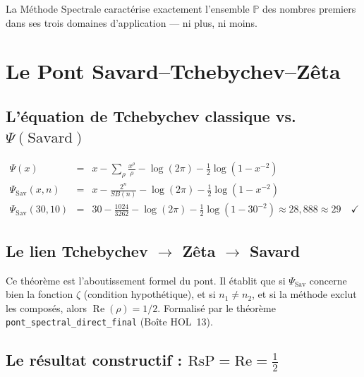 \documentclass[]{pasj02}
\begin{document}
\begin{theorem}
  La Méthode Spectrale caractérise exactement l'ensemble $\mathbb{P}$ des
  nombres premiers dans ses trois domaines d'application --- ni plus, ni
  moins.
\end{theorem}

\section{Le Pont Savard--Tchebychev--Zêta}
\label{sec:pont}

\subsection{L'équation de Tchebychev classique vs.\
$\Psi(\mathrm{Savard})$}
\label{ssec:tchebychev}
\label{hol:pont_tchebychev}

\begin{eqnarray}
  \Psi(x) &=& x - \sum_{\rho}\frac{x^{\rho}}{\rho}
              - \log(2\pi) - \tfrac{1}{2}\log(1-x^{-2}) \\
  \Psi_{\mathrm{Sav}}(x,n) &=& x - \frac{2^n}{SB(n)}
              - \log(2\pi) - \tfrac{1}{2}\log(1-x^{-2}) \\
  \Psi_{\mathrm{Sav}}(30,10) &=& 30 - \frac{1024}{3262}
              - \log(2\pi) - \tfrac{1}{2}\log(1-30^{-2})
              \approx 28{,}888 \approx 29 \quad\checkmark
\end{eqnarray}

\subsection{Le lien Tchebychev $\to$ Zêta $\to$ Savard}
\label{ssec:lien}
\label{hol:pont_savard_tchebychev_zeta}

Ce théorème est l'aboutissement formel du pont.  Il établit que si
$\Psi_{\mathrm{Sav}}$ concerne bien la fonction $\zeta$ (condition
hypothétique), et si $n_1 \neq n_2$, et si la méthode exclut les composés,
alors $\operatorname{Re}(\rho) = 1/2$.  Formalisé par le théorème
\texttt{pont\_spectral\_direct\_final} (Boîte HOL~13).

\subsection{Le résultat constructif : $\mathrm{RsP} = \mathrm{Re} =
\tfrac{1}{2}$}
\label{ssec:resultat}
\label{hol:re_droite_critique}
\end{document}
